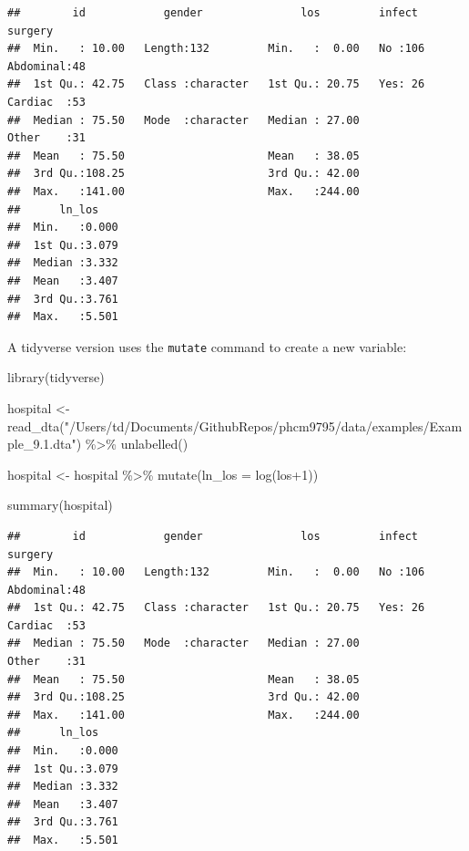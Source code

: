 \documentclass[
]{memoir}
\newenvironment{Shaded}{\begin{snugshade}}{\end{snugshade}}
\newcommand{\AttributeTok}[1]{\textcolor[rgb]{0.77,0.63,0.00}{#1}}
\newcommand{\DecValTok}[1]{\textcolor[rgb]{0.00,0.00,0.81}{#1}}
\newcommand{\FunctionTok}[1]{\textcolor[rgb]{0.00,0.00,0.00}{#1}}
\newcommand{\NormalTok}[1]{#1}
\newcommand{\OtherTok}[1]{\textcolor[rgb]{0.56,0.35,0.01}{#1}}
\newcommand{\SpecialCharTok}[1]{\textcolor[rgb]{0.00,0.00,0.00}{#1}}
\newcommand{\StringTok}[1]{\textcolor[rgb]{0.31,0.60,0.02}{#1}}
\begin{document}
\begin{verbatim}
##        id            gender               los         infect         surgery  
##  Min.   : 10.00   Length:132         Min.   :  0.00   No :106   Abdominal:48  
##  1st Qu.: 42.75   Class :character   1st Qu.: 20.75   Yes: 26   Cardiac  :53  
##  Median : 75.50   Mode  :character   Median : 27.00             Other    :31  
##  Mean   : 75.50                      Mean   : 38.05                           
##  3rd Qu.:108.25                      3rd Qu.: 42.00                           
##  Max.   :141.00                      Max.   :244.00                           
##      ln_los     
##  Min.   :0.000  
##  1st Qu.:3.079  
##  Median :3.332  
##  Mean   :3.407  
##  3rd Qu.:3.761  
##  Max.   :5.501
\end{verbatim}

A tidyverse version uses the \texttt{mutate} command to create a new variable:

\begin{Shaded}
\begin{Highlighting}[]
\FunctionTok{library}\NormalTok{(tidyverse)}

\NormalTok{hospital }\OtherTok{\textless{}{-}} \FunctionTok{read\_dta}\NormalTok{(}\StringTok{"/Users/td/Documents/GithubRepos/phcm9795/data/examples/Example\_9.1.dta"}\NormalTok{) }\SpecialCharTok{\%\textgreater{}\%} 
  \FunctionTok{unlabelled}\NormalTok{()}

\NormalTok{hospital }\OtherTok{\textless{}{-}}\NormalTok{ hospital }\SpecialCharTok{\%\textgreater{}\%} 
  \FunctionTok{mutate}\NormalTok{(}\AttributeTok{ln\_los =} \FunctionTok{log}\NormalTok{(los}\SpecialCharTok{+}\DecValTok{1}\NormalTok{))}

\FunctionTok{summary}\NormalTok{(hospital)}
\end{Highlighting}
\end{Shaded}

\begin{verbatim}
##        id            gender               los         infect         surgery  
##  Min.   : 10.00   Length:132         Min.   :  0.00   No :106   Abdominal:48  
##  1st Qu.: 42.75   Class :character   1st Qu.: 20.75   Yes: 26   Cardiac  :53  
##  Median : 75.50   Mode  :character   Median : 27.00             Other    :31  
##  Mean   : 75.50                      Mean   : 38.05                           
##  3rd Qu.:108.25                      3rd Qu.: 42.00                           
##  Max.   :141.00                      Max.   :244.00                           
##      ln_los     
##  Min.   :0.000  
##  1st Qu.:3.079  
##  Median :3.332  
##  Mean   :3.407  
##  3rd Qu.:3.761  
##  Max.   :5.501
\end{verbatim}
\end{document}
